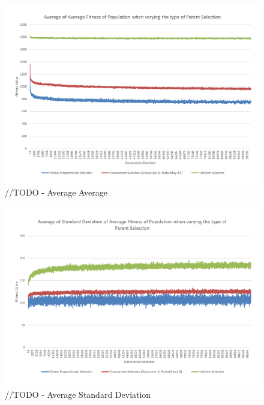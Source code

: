 \begin{figure}
	\centerline{\includegraphics[width=\paperwidth]{figures/CircleTests/CircleTestParentSelectionAverageAverage.pdf}}
	\caption{//TODO - Average Average}
\end{figure}

\begin{figure}
	\centerline{\includegraphics[width=\paperwidth]{figures/CircleTests/CircleTestParentSelectionAverageStandardDeviation.pdf}}
	\caption{//TODO - Average Standard Deviation}
\end{figure}

